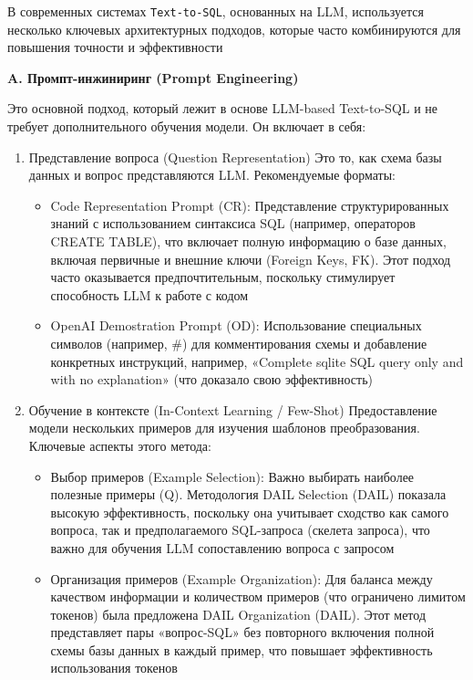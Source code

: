 В современных системах \texttt{Text-to-SQL}, основанных на LLM, используется несколько ключевых архитектурных подходов, которые часто комбинируются для повышения точности и эффективности


\textbf{A. Промпт-инжиниринг (Prompt Engineering)}

Это основной подход, который лежит в основе LLM-based Text-to-SQL и не требует дополнительного обучения модели. Он включает в себя:

\begin{enumerate}

    \item Представление вопроса (Question Representation) Это то, как схема базы данных и вопрос представляются LLM. Рекомендуемые форматы:
    \begin{itemize}
        \item Code Representation Prompt (CR): Представление структурированных знаний с использованием синтаксиса SQL (например, операторов CREATE TABLE), что включает полную информацию о базе данных, включая первичные и внешние ключи (Foreign Keys, FK). Этот подход часто оказывается предпочтительным, поскольку стимулирует способность LLM к работе с кодом
        \item OpenAI Demostration Prompt (OD): Использование специальных символов (например, \#) для комментирования схемы и добавление конкретных инструкций, например, «Complete sqlite SQL query only and with no explanation» (что доказало свою эффективность)
    \end{itemize}

    \item Обучение в контексте (In-Context Learning / Few-Shot) Предоставление модели нескольких примеров для изучения шаблонов преобразования. Ключевые аспекты этого метода:
    \begin{itemize}
        \item Выбор примеров (Example Selection): Важно выбирать наиболее полезные примеры (Q). Методология DAIL Selection (DAIL) показала высокую эффективность, поскольку она учитывает сходство как самого вопроса, так и предполагаемого SQL-запроса (скелета запроса), что важно для обучения LLM сопоставлению вопроса с запросом
        \item Организация примеров (Example Organization): Для баланса между качеством информации и количеством примеров (что ограничено лимитом токенов) была предложена DAIL Organization (DAIL). Этот метод представляет пары «вопрос-SQL» без повторного включения полной схемы базы данных в каждый пример, что повышает эффективность использования токенов
    \end{itemize}


\end{enumerate}
